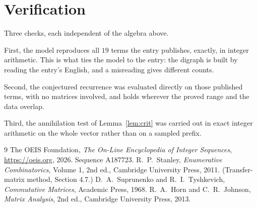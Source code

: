 \documentclass[11pt,a4paper]{article}
\theoremstyle{plain}
\theoremstyle{definition}
\begin{document}
\section{Verification}

Three checks, each independent of the algebra above.

First, the model reproduces all $19$ terms the entry publishes, exactly, in integer
arithmetic. This is what ties the model to the entry: the digraph is built by reading the
entry's English, and a misreading gives different counts.

Second, the conjectured recurrence was evaluated directly on those published terms, with no
matrices involved, and holds wherever the proved range and the data overlap.

Third, the annihilation test of Lemma~\ref{lem:crit} was carried out in exact integer
arithmetic on the whole vector rather than on a sampled prefix.

\begin{thebibliography}{9}
 The OEIS Foundation, \emph{The On-Line Encyclopedia of Integer
Sequences}, \url{https://oeis.org}, 2026. Sequence A187723.
 R.~P.~Stanley, \emph{Enumerative Combinatorics}, Volume 1, 2nd ed.,
Cambridge University Press, 2011. (Transfer-matrix method, Section 4.7.)
 D.~A.~Suprunenko and R.~I.~Tyshkevich, \emph{Commutative Matrices},
Academic Press, 1968.
 R.~A.~Horn and C.~R.~Johnson, \emph{Matrix Analysis}, 2nd ed., Cambridge
University Press, 2013.
\end{thebibliography}
\end{document}
